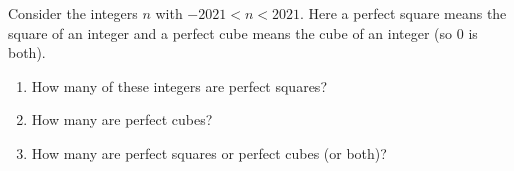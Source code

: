 Consider the integers $n$ with $-2021<n<2021$. Here a perfect square means the square of an integer and a perfect cube means the cube of an integer (so $0$ is both).
\begin{enumerate}
\item[(a)] How many of these integers are perfect squares?
\item[(b)] How many are perfect cubes?
\item[(c)] How many are perfect squares or perfect cubes (or both)?
\end{enumerate}
